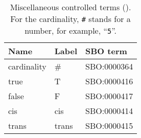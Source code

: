 \begin{table}[h]
  \centering
  \begin{tabular}{l>{\ttfamily}l>{\ttfamily}l}
    \toprule
    \textbf{Name}   & \textbf{\rmfamily Label} & \textbf{\rmfamily SBO term} \\
    \midrule
    cardinality    & \#  & SBO:0000364\\
    true           & T     & SBO:0000416\\
    false          & F     & SBO:0000417\\
    cis            & cis   & SBO:0000414\\
    trans          & trans & SBO:0000415\\
    \bottomrule
  \end{tabular}
  \caption{Miscellaneous controlled terms  (). For the cardinality, \texttt{\#} stands for a number, for example, ``\texttt{5}''.}
  \label{tab:reserved-words}
\end{table}

